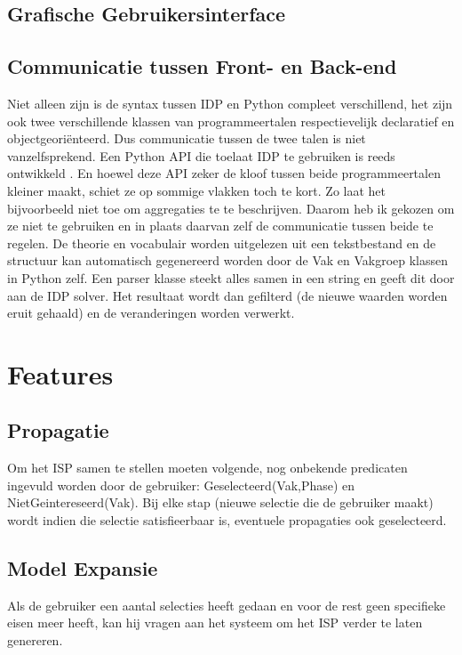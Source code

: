 \subsection{Grafische Gebruikersinterface}



\subsection{Communicatie tussen Front- en Back-end}
Niet alleen zijn is de syntax tussen IDP en Python compleet verschillend, het zijn ook twee verschillende klassen van programmeertalen respectievelijk declaratief en objectgeori\"{e}nteerd. Dus communicatie tussen de twee talen is niet vanzelfsprekend. Een Python API die toelaat IDP te gebruiken is reeds ontwikkeld \citep{vennekens2015lowering}. En hoewel deze API zeker de kloof tussen beide programmeertalen kleiner maakt, schiet ze op sommige vlakken toch te kort. Zo laat het bijvoorbeeld niet toe om aggregaties te te beschrijven. Daarom heb ik gekozen om ze niet te gebruiken en in plaats daarvan zelf de communicatie tussen beide te regelen. De theorie en vocabulair worden uitgelezen uit een tekstbestand en de structuur kan automatisch gegenereerd worden door de Vak en Vakgroep klassen in Python zelf. Een parser klasse steekt alles samen in een string en geeft dit door aan de IDP solver. Het resultaat wordt dan gefilterd (de nieuwe waarden worden eruit gehaald) en de veranderingen worden verwerkt. 

\section{Features}

\subsection{Propagatie}
Om het ISP samen te stellen moeten volgende, nog onbekende predicaten ingevuld worden door de gebruiker: Geselecteerd(Vak,Phase) en NietGeintereseerd(Vak). Bij elke stap (nieuwe selectie die de gebruiker maakt) wordt indien die selectie satisfieerbaar is, eventuele propagaties ook geselecteerd. 

\subsection{Model Expansie}
Als de gebruiker een aantal selecties heeft gedaan en voor de rest geen specifieke eisen meer heeft, kan hij vragen aan het systeem om het ISP verder te laten genereren. 

